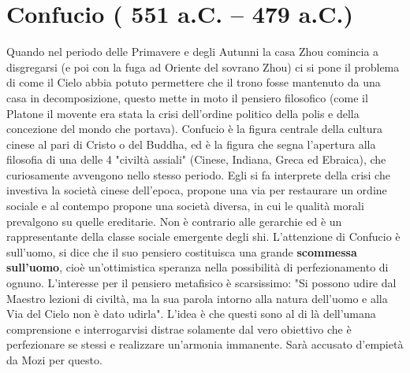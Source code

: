 \documentclass[10pt,a4paper]{report}
\begin{document}
\section{Confucio ( 551 a.C. – 479 a.C.)}
Quando nel periodo delle Primavere e degli Autunni la casa Zhou comincia a disgregarsi (e poi con la fuga ad Oriente del sovrano Zhou) ci si pone il problema di come il Cielo abbia potuto permettere che il trono fosse mantenuto da una casa in decomposizione, questo mette in moto il pensiero filosofico (come il Platone il movente era stata la crisi dell'ordine politico della polis e della concezione del mondo che portava). Confucio è la figura centrale della cultura cinese al pari di Cristo o del Buddha, ed è la figura che segna l'apertura alla filosofia di una delle 4 "civiltà assiali" (Cinese, Indiana, Greca ed Ebraica), che curiosamente avvengono nello stesso periodo. Egli si fa interprete della crisi che investiva la società cinese dell'epoca, propone una via per restaurare un ordine sociale e al contempo propone una società diversa, in cui le qualità morali prevalgono su quelle ereditarie. Non è contrario alle gerarchie ed è un rappresentante della classe sociale emergente degli shi. L'attenzione di Confucio è sull'uomo, si dice che il suo pensiero costituisca una grande \textbf{scommessa sull'uomo}, cioè un'ottimistica speranza nella possibilità di perfezionamento di ognuno. L'interesse per il pensiero metafisico è scarsissimo: "Si possono udire dal Maestro lezioni di civiltà, ma la sua parola intorno alla natura dell'uomo e alla Via del Cielo non è dato udirla". L'idea è che questi sono al di là dell'umana comprensione e interrogarvisi distrae solamente dal vero obiettivo che è perfezionare se stessi e realizzare un'armonia immanente. Sarà accusato d'empietà da Mozi per questo.
\end{document}
